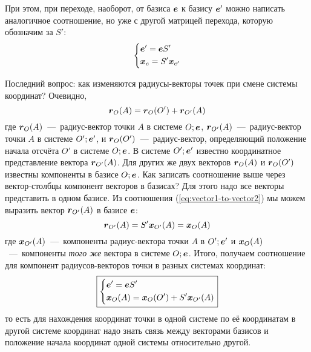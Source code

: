 \documentclass[a4paper,12pt]{article}
\begin{document}
  При этом, при переходе, наоборот, от базиса $\boldsymbol e$ к базису $\boldsymbol e'$
  можно написать аналогичное соотношение, но уже с другой матрицей перехода, которую обозначим за $S'$:
  \[
    \left\{
      \begin{aligned}
        &\boldsymbol e' = \boldsymbol e S'\\
        &\boldsymbol x_{e} = S' \boldsymbol x_{e'}
      \end{aligned}
    \right.
  \]
  
  Последний вопрос: как изменяются радиусы-векторы точек при смене системы координат?
  Очевидно,
  \[
    \boldsymbol r_O(A) = \boldsymbol r_O(O') + \boldsymbol r_{O'}(A)
  \]
  где $\boldsymbol r_O(A)$~---~радиус-вектор точки $A$ в системе $O; \boldsymbol e$,
  $\boldsymbol r_{O'}(A)$~---~радиус-вектор точки $A$ в системе $O'; \boldsymbol e'$,
  и $\boldsymbol r_O(O')$~---~радиус-вектор, определяющий положение начала отсчёта $O'$ в системе $O; \boldsymbol e$.
  В системе $O'; \boldsymbol e'$ известно координатное представление вектора $ \boldsymbol r_{O'}(A)$.
  Для других же двух векторов $\boldsymbol r_O(A)$ и $\boldsymbol r_O(O')$ известны компоненты в базисе $O; \boldsymbol e$.
  Как записать соотношение выше через вектор-столбцы компонент векторов в базисах?
  Для этого надо все векторы представить в одном базисе.
  Из соотношения (\ref{eq:vector1-to-vector2}) мы можем выразить вектор $\boldsymbol r_{O'}(A)$ в базисе $\boldsymbol e$:
  \[
    \boldsymbol r_{O'}(A) = S' \boldsymbol x_{O'}(A) = \boldsymbol x_{O}(A)
  \]
  где $\boldsymbol x_{O'}(A)$~---~компоненты радиус-вектора точки $A$ в $O'; \boldsymbol e'$ и $\boldsymbol x_{O}(A)$~---~компоненты \emph{того же} вектора в системе $O; \boldsymbol e$.
  Итого, получаем соотношение для компонент радиусов-векторов точки в разных системах координат:
  \begin{equation}\label{eq:point1-to-point2}
    \boxed{
      \left\{
        \begin{aligned}
          &\boldsymbol e' = \boldsymbol e S'\\
          &\boldsymbol x_O(A) = \boldsymbol x_O(O') + S' \boldsymbol x_{O'}(A)
        \end{aligned}
      \right.
    }
  \end{equation}
  то есть для нахождения координат точки в одной системе по её координатам в другой системе координат надо знать связь между векторами базисов и положение начала координат одной системы относительно другой.
  
\end{document}
